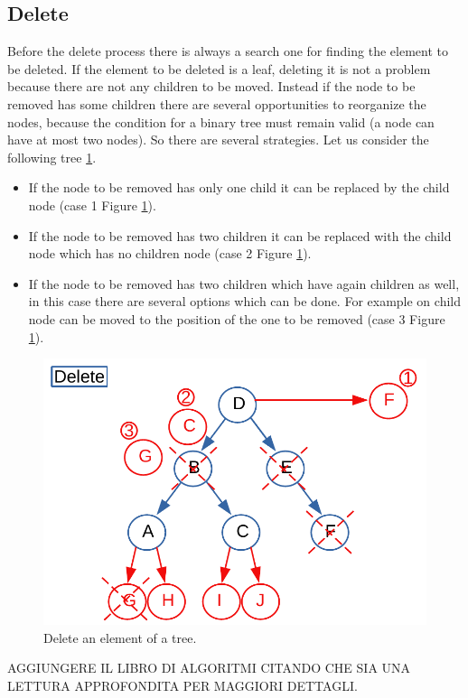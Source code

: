 \subsection{Delete}
Before the delete process there is always a search one for finding the element to be deleted. If the element to be deleted is a leaf, deleting it is not a problem because there are not any children to be moved. Instead if the node to be removed has some children there are several opportunities to reorganize the nodes, because the condition for a binary tree must remain valid (a node can have at most two nodes). So there are several strategies. Let us consider the following tree \ref{trees_9}. 
\begin{itemize}
\item If the node to be removed has only one child it can be replaced by the child node (case 1 Figure \ref{trees_9}).
\item If the node to be removed has two children it can be replaced with the child node which has no children node (case 2 Figure \ref{trees_9}).
\item If the node to be removed has two children which have again children as well, in this case there are several options which can be done. For example on child node can be moved to the position of the one to be removed (case 3 Figure \ref{trees_9}).
\end{itemize} 

\begin{figure}[H]
	\begin{center}
		\includegraphics[scale=.6]{chapters/trees/images/trees_9.pdf}
		\caption[Delete an element of a tree.]{Delete an element of a tree.}
		\label{trees_9}
	\end{center}
\end{figure}
AGGIUNGERE IL LIBRO DI ALGORITMI CITANDO CHE SIA UNA LETTURA APPROFONDITA PER MAGGIORI DETTAGLI.

